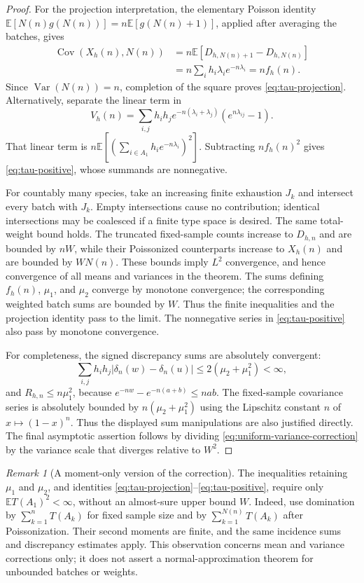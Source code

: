 \documentclass[11pt]{article}
\numberwithin{equation}{section}
\theoremstyle{remark}
\newtheorem{remark}[theorem]{Remark}
\newcommand{\E}{\mathbb E}
\newcommand{\Var}{\operatorname{Var}}
\begin{document}
\begin{proof}
For the projection interpretation, the elementary Poisson identity
$\E[N(n)g(N(n))]=n\E[g(N(n)+1)]$, applied after averaging the batches,
gives
\begin{align*}
 \operatorname{Cov}(X_h(n),N(n))
 &=n\E[D_{h,N(n)+1}-D_{h,N(n)}]\\
 &=n\sum_i h_i\lambda_i e^{-n\lambda_i}=nf_h(n).
\end{align*}
Since $\Var(N(n))=n$, completion of the square proves
\eqref{eq:tau-projection}. Alternatively, separate the linear term in
\[
 V_h(n)=\sum_{i,j}h_i h_j e^{-n(\lambda_i+\lambda_j)}
                                  (e^{n\lambda_{ij}}-1).
\]
That linear term is
$n\E[(\sum_{i\in A_1}h_i e^{-n\lambda_i})^2]$.
Subtracting $nf_h(n)^2$ gives \eqref{eq:tau-positive}, whose summands are
nonnegative.

For countably many species, take an increasing finite exhaustion $J_k$ and
intersect every batch with $J_k$. Empty intersections cause no contribution;
identical intersections may be coalesced if a finite type space is desired.
The same total-weight bound holds. The truncated fixed-sample counts
increase to $D_{h,n}$ and are bounded by $nW$, while their Poissonized
counterparts increase to $X_h(n)$ and are bounded by $WN(n)$.
These bounds imply $L^2$ convergence, and hence convergence of all means
and variances in the theorem. The sums defining $f_h(n)$, $\mu_1$, and
$\mu_2$ converge by monotone convergence; the corresponding weighted
batch sums are bounded by $W$. Thus the finite inequalities and the
projection identity pass to the limit. The nonnegative series in
\eqref{eq:tau-positive} also pass by monotone convergence.

For completeness, the signed discrepancy sums are absolutely convergent:
\[
 \sum_{i,j}h_i h_j|\delta_n(w)-\delta_n(u)|
 \le2(\mu_2+\mu_1^2)<\infty,
\]
and $R_{h,n}\le n\mu_1^2$, because
$e^{-nw}-e^{-n(a+b)}\le nab$. The fixed-sample covariance series is
absolutely bounded by $n(\mu_2+\mu_1^2)$ using the Lipschitz constant $n$
of $x\mapsto(1-x)^n$. Thus the displayed sum manipulations are also
justified directly. The final asymptotic assertion follows by dividing
\eqref{eq:uniform-variance-correction} by the variance scale that diverges
relative to $W^2$.
\end{proof}

\begin{remark}[A moment-only version of the correction]
\label{rem:uniform-moment-correction}
The inequalities retaining $\mu_1$ and $\mu_2$, and identities
\eqref{eq:tau-projection}--\eqref{eq:tau-positive}, require only
$\E T(A_1)^2<\infty$, without an almost-sure upper bound $W$.
Indeed, use domination by $\sum_{k=1}^nT(A_k)$ for fixed sample size and
by $\sum_{k=1}^{N(n)}T(A_k)$ after Poissonization. Their second moments are
finite, and the same incidence sums and discrepancy estimates apply.
This observation concerns mean and variance corrections only; it does not
assert a normal-approximation theorem for unbounded batches or weights.
\end{remark}
\end{document}
